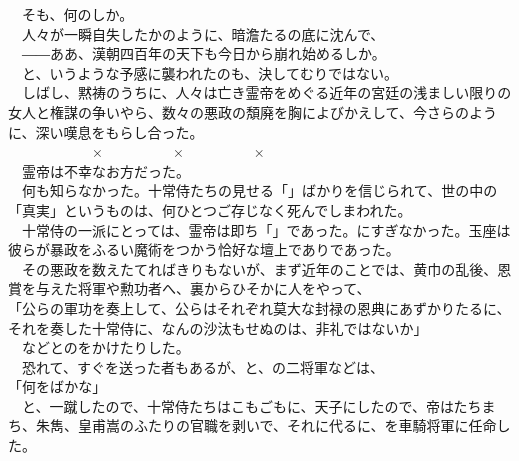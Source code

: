 \documentclass[
  paper=a5,
  fontsize=10pt,
  jafontsize=9.5pt,
  tate,                  %
  open_bracket_pos=nibu, %
]{jlreq}
\begin{document}
　そも、何のしか。\\


　人々が一瞬自失したかのように、暗澹たるの底に沈んで、\\


　――ああ、漢朝四百年の天下も今日から崩れ始めるしか。\\


　と、いうような予感に襲われたのも、決してむりではない。\\


　しばし、黙祷のうちに、人々は亡き霊帝をめぐる近年の宮廷の浅ましい限りの女人と権謀の争いやら、数々の悪政の頽廃を胸によびかえして、今さらのように、深い嘆息をもらし合った。\\


　　　　　　×　　　　　×　　　　　×\\


　霊帝は不幸なお方だった。\\


　何も知らなかった。十常侍たちの見せる「」ばかりを信じられて、世の中の「真実」というものは、何ひとつご存じなく死んでしまわれた。\\


　十常侍の一派にとっては、霊帝は即ち「」であった。にすぎなかった。玉座は彼らが暴政をふるい魔術をつかう恰好な壇上でありであった。\\


　その悪政を数えたてればきりもないが、まず近年のことでは、黄巾の乱後、恩賞を与えた将軍や勲功者へ、裏からひそかに人をやって、\\


「公らの軍功を奏上して、公らはそれぞれ莫大な封禄の恩典にあずかりたるに、それを奏した十常侍に、なんの沙汰もせぬのは、非礼ではないか」\\


　などとのをかけたりした。\\


　恐れて、すぐを送った者もあるが、と、の二将軍などは、\\


「何をばかな」\\


　と、一蹴したので、十常侍たちはこもごもに、天子にしたので、帝はたちまち、朱雋、皇甫嵩のふたりの官職を剥いで、それに代るに、を車騎将軍に任命した。\\
\end{document}
